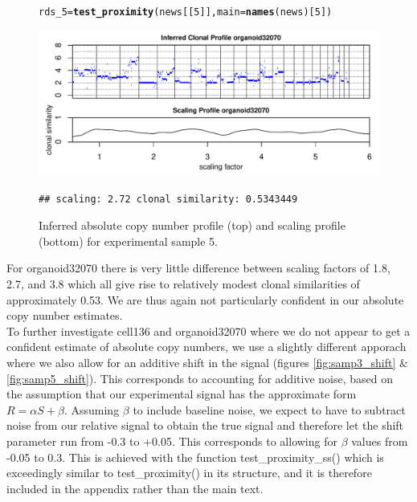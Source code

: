 \documentclass[12pt]{article}\usepackage[]{graphicx}\usepackage[]{color}
\makeatletter
\newcommand{\hlnum}[1]{\textcolor[rgb]{0.686,0.059,0.569}{#1}}%
\newcommand{\hlstd}[1]{\textcolor[rgb]{0.345,0.345,0.345}{#1}}%
\newcommand{\hlkwb}[1]{\textcolor[rgb]{0.69,0.353,0.396}{#1}}%
\newcommand{\hlkwc}[1]{\textcolor[rgb]{0.333,0.667,0.333}{#1}}%
\newcommand{\hlkwd}[1]{\textcolor[rgb]{0.737,0.353,0.396}{\textbf{#1}}}%
\newenvironment{kframe}{%
 \def\at@end@of@kframe{}%
 \ifinner\ifhmode%
  \def\at@end@of@kframe{\end{minipage}}%
  \begin{minipage}{\columnwidth}%
 \fi\fi%
 \def\FrameCommand##1{\hskip\@totalleftmargin \hskip-\fboxsep
 \colorbox{shadecolor}{##1}\hskip-\fboxsep
     \hskip-\linewidth \hskip-\@totalleftmargin \hskip\columnwidth}%
 \MakeFramed {\advance\hsize-\width
   \@totalleftmargin\z@ \linewidth\hsize
   \@setminipage}}%
 {\par\unskip\endMakeFramed%
 \at@end@of@kframe}
\newenvironment{knitrout}{}{} %
\makeatother
\begin{document}
\begin{figure}[h!]
  \centering
\begin{knitrout}
\color{fgcolor}\begin{kframe}
\begin{alltt}
\hlstd{rds_5} \hlkwb{=} \hlkwd{test_proximity}\hlstd{(news[[}\hlnum{5}\hlstd{]],} \hlkwc{main} \hlstd{=} \hlkwd{names}\hlstd{(news)[}\hlnum{5}\hlstd{])}
\end{alltt}
\end{kframe}
\includegraphics[width=.95\linewidth]{figure/unnamed-chunk-19-1} 
\begin{kframe}\begin{verbatim}
## scaling: 2.72 clonal similarity: 0.5343449
\end{verbatim}
\end{kframe}
\end{knitrout}
\caption{Inferred absolute copy number profile (top) and scaling profile (bottom) for experimental sample 5.}
\label{fig:samp5}
\end{figure}

For organoid32070 there is very little difference between scaling factors of 1.8, 2.7, and 3.8 which all give rise to relatively modest clonal similarities of approximately 0.53. We are thus again not particularly confident in our absolute copy number estimates.\\

To further investigate cell136 and organoid32070 where we do not appear to get a confident estimate of absolute copy numbers, we use a slightly different apporach where we also allow for an additive shift in the signal (figures \ref{fig:samp3_shift} \& \ref{fig:samp5_shift}). This corresponds to accounting for additive noise, based on the assumption that our experimental signal has the approximate form $R = \alpha S + \beta$. Assuming $\beta$ to include baseline noise, we expect to have to subtract noise from our relative signal to obtain the true signal and therefore let the shift parameter run from -0.3 to +0.05. This corresponds to allowing for $\beta$ values from -0.05 to 0.3. This is achieved with the function test\_proximity\_ss() which is exceedingly similar to test\_proximity() in its structure, and it is therefore included in the appendix rather than the main text.\\
\end{document}
